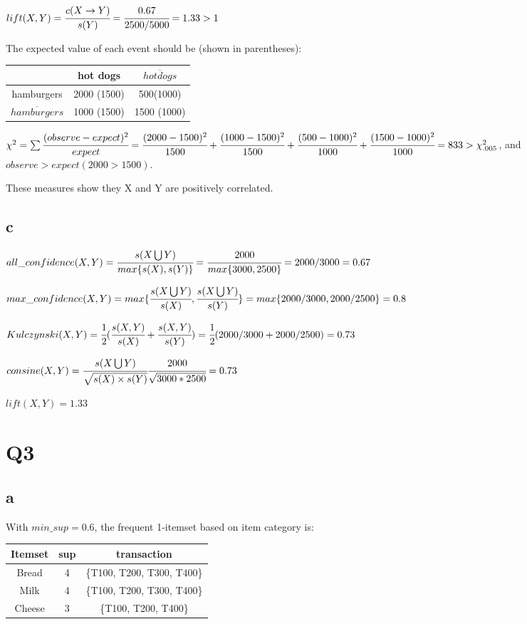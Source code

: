 \documentclass[]{article}
\begin{document}
$lift(X, Y)=\cfrac{c(X\rightarrow Y)}{s(Y)}=\cfrac{0.67}{2500/5000}=1.33>1$

The expected value of each event should be (shown in parentheses):\\
\begin{table}[!ht]
    \centering
    \begin{tabular}{c c c}
    \hline
     & \textbf{hot dogs} & \textbf{$\overline{hot dogs}$} \\
    \hline
    hamburgers & 2000 (1500) &   500(1000) \\
    $\overline{hamburgers}$ & 1000 (1500) &  1500 (1000) \\ 
    \hline
    \end{tabular}
\end{table}

$\chi^2 = \sum\cfrac{(observe-expect)^2}{expect}
=\cfrac{(2000-1500)^2}{1500}+\cfrac{(1000-1500)^2}{1500}+\cfrac{(500-1000)^2}{1000}+\cfrac{(1500-1000)^2}{1000}=833>\chi^2_{.005}$, and $observe>expect (2000>1500)$.

These measures show they X and Y are positively correlated. 

\subsection*{c}
$all\_confidence(X,Y) = \cfrac{s(X\bigcup Y)}{max\{s(X),s(Y)\}}
=\cfrac{2000}{max\{3000, 2500\}}=2000/3000=0.67$

$max\_confidence(X,Y) = max\{\cfrac{s(X\bigcup Y)}{s(X)}, \cfrac{s(X\bigcup Y)}{s(Y)}\}
=max\{2000/3000, 2000/2500\}=0.8$

$Kulczynski(X,Y)=\cfrac{1}{2}(\cfrac{s(X,Y)}{s(X)}+\cfrac{s(X,Y)}{s(Y)})
=\cfrac{1}{2}(2000/3000+2000/2500)=0.73$

$consine(X,Y)=\cfrac{s(X\bigcup Y)}{\sqrt{s(X)\times s(Y)}}
\cfrac{2000}{\sqrt{3000*2500}}=0.73$

$lift(X,Y)=1.33$

\newpage

\section*{Q3}
\subsection*{a}

With $min\_sup=0.6$, the frequent 1-itemset based on item category is: \\
\begin{table}[!ht]
    \begin{tabular}{c c c}
        \hline 
        \textbf{Itemset} & \textbf{sup} & \textbf{transaction}\\
        \hline
        Bread & 4 & \{T100, T200, T300, T400\}\\
        Milk & 4 & \{T100, T200, T300, T400\}\\
        Cheese & 3 & \{T100, T200, T400\}\\
        \hline
    \end{tabular}
\end{table}
\end{document}
